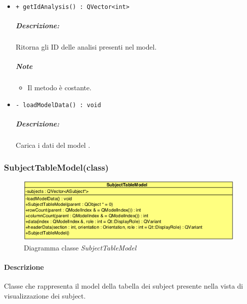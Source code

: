 {\begin{itemize}
\begin{itemize}
			\item \color{RoyalPurple}\verb! role : int!\\
			\color{black}Regola di visualizzazione Qt\g{}.
		\end{itemize}
	\subparagraph{Note}
			\begin{itemize}
				\item Il metodo è costante.
			\end{itemize}
		
	\item \color{blue}\verb!+ getIdAnalysis() : QVector<int>!\\
		\color{black}
		\subparagraph{Descrizione:} Ritorna gli ID delle analisi presenti nel model.\\
		\subparagraph{Note}
				\begin{itemize}
					\item Il metodo è costante.
				\end{itemize}
			
	\item \color{blue}\verb!- loadModelData() : void!\\
		\color{black}
		\subparagraph{Descrizione:} Carica i dati del model .\\
\end{itemize}
\pagebreak


\subsubsection{SubjectTableModel(class)}
\label{SubjectTableModel}
\begin{figure}[!h]
	\centering
	\includegraphics[width=0.6\linewidth]{./Content/Immagini/QtModel/SubjectTableModel.png}
	\caption{Diagramma classe \textsl{SubjectTableModel}}
	\label{comp_SubjectTableModelv}
\end{figure}

\paragraph{Descrizione\\} 
Classe che rappresenta il model della tabella dei subject\g{} presente nella vista di visualizzazione dei subject\g{}.

}
